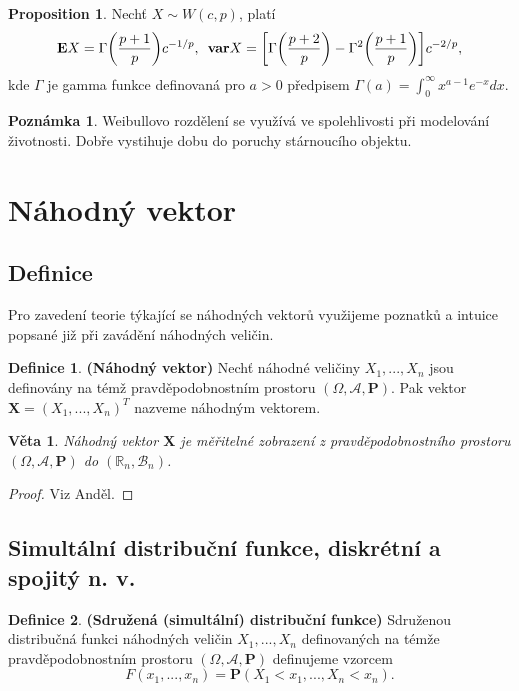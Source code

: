 \documentclass[a4]{report}
\newtheorem{theorem}{Věta}
\theoremstyle{definition}
\newtheorem{definition}{Definice}[section]
\newtheorem{remark}{Poznámka}[section]
\newtheorem{proposition}{Proposition}[section]
\begin{document}
{\begin{proposition}
Nechť $X \sim W(c, p)$, platí
\begin{equation}
\mathbf{E}X = \Gamma\bigg( \frac{p + 1}{p} \bigg) c^{-1/p}, \enskip \mathbf{var}X = \bigg[ \Gamma \bigg( \frac{p+2}{p}\bigg) - \Gamma^{2} \bigg( \frac{p + 1}{p}\bigg) \bigg] c^{-2/p}, 
\end{equation}
kde $\Gamma$ je gamma funkce definovaná pro $a>0$ předpisem $\Gamma(a) = \int_{0}^{\infty} x^{a - 1}e^{-x}dx.$
\end{proposition}

\begin{remark}
Weibullovo rozdělení se využívá ve spolehlivosti při modelování životnosti. Dobře vystihuje dobu do poruchy stárnoucího objektu.
\end{remark}

\section{Náhodný vektor}
\subsection{Definice}
Pro zavedení teorie týkající se náhodných vektorů využijeme poznatků a intuice popsané již při zavádění náhodných veličin.
\begin{definition}{\textbf{(Náhodný vektor)}}
Nechť náhodné veličiny $X_{1}, ..., X_{n}$ jsou definovány na témž pravděpodobnostním prostoru $(\Omega, \mathcal{A}, \textbf{P})$. Pak vektor $\textbf{X} = (X_{1}, ..., X_{n})^{T}$ nazveme náhodným vektorem. 
\end{definition}
\begin{theorem}
Náhodný vektor $\textbf{X}$ je měřitelné zobrazení z pravděpodobnostního prostoru $(\Omega, \mathcal{A}, \textbf{P})$ do $(\mathbb{R}_{n}, \mathcal{B}_{n})$.
\end{theorem}
\begin{proof}
Viz Anděl.
\end{proof}
\subsection{Simultální distribuční funkce, diskrétní a spojitý n. v.}
\begin{definition}{\textbf{(Sdružená (simultální) distribuční funkce)}}
Sdruženou distribučná funkci náhodných veličin $X_{1}, ..., X_{n}$ definovaných na témže pravděpodobnostním prostoru $(\Omega, \mathcal{A}, \textbf{P})$ definujeme vzorcem
\begin{equation}
F(x_{1}, ..., x_{n}) = \textbf{P}(X_{1} < x_{1}, ..., X_{n} < x_{n}).
\end{equation}
\end{definition}

}
\end{document}
